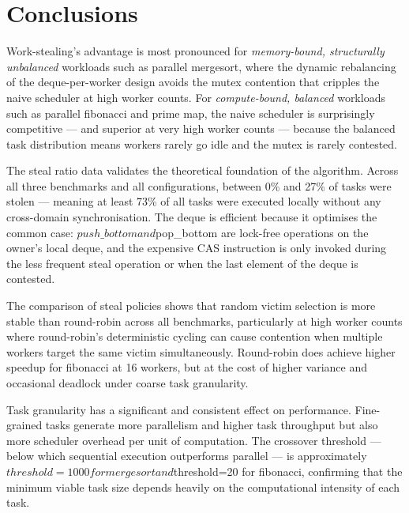 \documentclass[11pt,a4paper]{article}
\begin{document}
\section{Conclusions}
\label{sec:conclusions}


Work-stealing's advantage is most
pronounced for \emph{memory-bound, structurally unbalanced} workloads
such as parallel mergesort, where the dynamic rebalancing of the
deque-per-worker design avoids the mutex contention that cripples the
naive scheduler at high worker counts. For \emph{compute-bound, balanced}
workloads such as parallel fibonacci and prime map, the naive scheduler
is surprisingly competitive — and superior at very high worker counts —
because the balanced task distribution means workers rarely go idle and
the mutex is rarely contested.

The steal ratio data validates the theoretical foundation of the
algorithm. Across all three benchmarks and all configurations, between
0\% and 27\% of tasks were stolen — meaning at least 73\% of all tasks
were executed locally without any cross-domain synchronisation. The deque
is efficient because it optimises the common case: ${push\_bottom}
and ${pop\_bottom} are lock-free operations on the owner's local
deque, and the expensive CAS instruction is only invoked during the less
frequent steal operation or when the last element of the deque is contested.

The comparison of steal policies shows that random victim selection is
more stable than round-robin across all benchmarks, particularly at high
worker counts where round-robin's deterministic cycling can cause
contention when multiple workers target the same victim simultaneously.
Round-robin does achieve higher speedup for fibonacci at 16 workers, but
at the cost of higher variance and occasional deadlock under coarse task
granularity.

Task granularity has a significant and consistent effect on performance.
Fine-grained tasks generate more parallelism and higher task throughput
but also more scheduler overhead per unit of computation. The crossover
threshold — below which sequential execution outperforms parallel — is
approximately ${threshold=1000} for mergesort and
${threshold=20} for fibonacci, confirming that the minimum viable
task size depends heavily on the computational intensity of each task.
\end{document}
